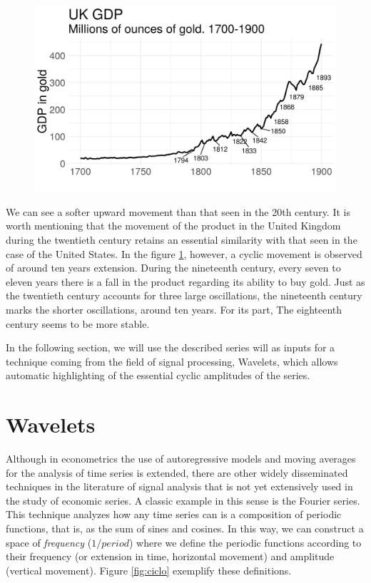 \documentclass[a4paper]{article}
\begin{document}
	\begin{figure}[H]
		\centering
		\includegraphics[width=0.75\linewidth]{uk_gdp_en.png}
		\caption{} 
		\label{fig:uk_gdp}
	\end{figure}
	
	
	We can see a softer upward movement than that seen in the 20th century. It is worth mentioning that the movement of the product in the United Kingdom during the twentieth century retains an essential similarity with that seen in the case of the United States. In the figure \ref{fig:uk_gdp}, however, a cyclic movement is observed of around ten years extension. During the nineteenth century, every seven to eleven years there is a fall in the product regarding its ability to buy gold. Just as the twentieth century accounts for three large oscillations, the nineteenth century marks the shorter oscillations, around ten years. For its part, The eighteenth century seems to be more stable.
	
	In the following section, we will use the described series will as inputs for a technique coming from the field of signal processing, Wavelets, which allows automatic highlighting of the essential cyclic amplitudes of the series.
	
	\section{Wavelets}
	
	Although in econometrics the use of autoregressive models and moving averages for the analysis of time series is extended, there are other widely disseminated techniques in the literature of signal analysis that is not yet extensively used in the study of economic series. A classic example in this sense is the Fourier series. This technique analyzes how any time series can is a composition of periodic functions, that is, as the sum of sines and cosines. In this way, we can construct a space of \textit{frequency} ($1/period$) where we define the periodic functions according to their frequency (or extension in time, horizontal movement) and amplitude (vertical movement). Figure \ref{fig:ciclo} exemplify these definitions.
	
\end{document}
